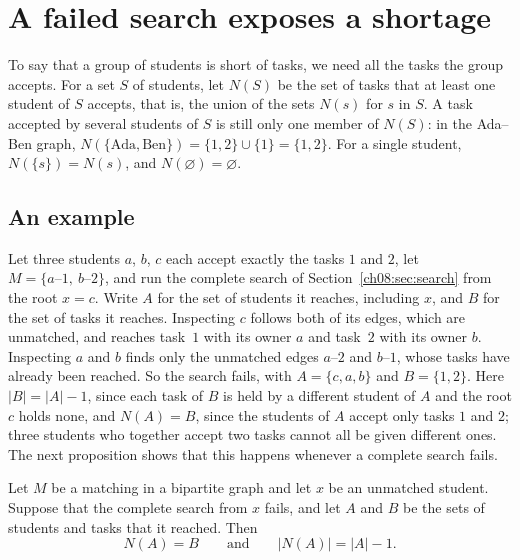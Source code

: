 \section{A failed search exposes a shortage}\label{ch08:sec:shortage}
To say that a group of students is short of tasks, we need all the tasks the group accepts. For a set $S$ of students, let $N(S)$ be the set of tasks that at least one student of $S$ accepts, that is, the union of the sets $N(s)$ for $s$ in $S$. A task accepted by several students of $S$ is still only one member of $N(S)$: in the Ada--Ben graph, $N(\{\text{Ada},\text{Ben}\})=\{1,2\}\cup\{1\}=\{1,2\}$. For a single student, $N(\{s\})=N(s)$, and $N(\varnothing)=\varnothing$.

\subsection*{An example}
Let three students $a$, $b$, $c$ each accept exactly the tasks $1$ and $2$, let $M=\{a\text{--}1,\ b\text{--}2\}$, and run the complete search of Section~\ref{ch08:sec:search} from the root $x=c$. Write $A$ for the set of students it reaches, including $x$, and $B$ for the set of tasks it reaches.
Inspecting $c$ follows both of its edges, which are unmatched, and reaches task~$1$ with its owner $a$ and task~$2$ with its owner $b$. Inspecting $a$ and $b$ finds only the unmatched edges $a$--$2$ and $b$--$1$, whose tasks have already been reached. So the search fails, with $A=\{c,a,b\}$ and $B=\{1,2\}$. Here $|B|=|A|-1$, since each task of $B$ is held by a different student of $A$ and the root $c$ holds none, and $N(A)=B$, since the students of $A$ accept only tasks $1$ and $2$; three students who together accept two tasks cannot all be given different ones. The next proposition shows that this happens whenever a complete search fails.

\par\noindent\begin{minipage}{\linewidth}
\begin{proposition}\label{ch08:prop:shortage}
Let $M$ be a matching in a bipartite graph and let $x$ be an unmatched student. Suppose that the complete search from $x$ fails, and let $A$ and $B$ be the sets of students and tasks that it reached. Then
\[
N(A)=B\qquad\text{and}\qquad |N(A)|=|A|-1.
\]
\end{proposition}
\end{minipage}\par

